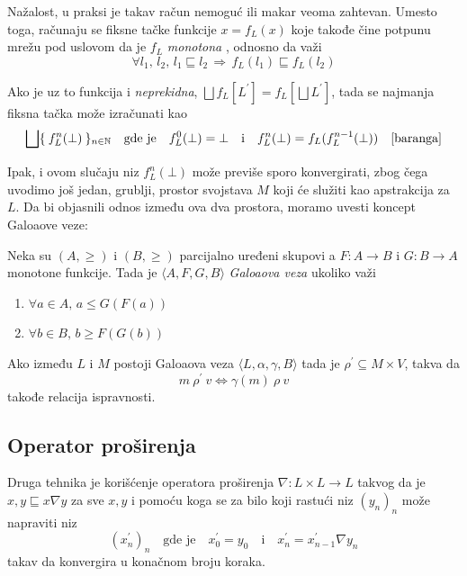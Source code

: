 Nažalost, u praksi je takav račun nemoguć ili makar veoma zahtevan. Umesto toga, računaju se fiksne tačke funkcije $x = f_{L}(x)$ koje takođe čine potpunu mrežu pod uslovom da je $f_{L}$ \emph{monotona} \cite{tarski}, odnosno da važi $$\forall l_{1},\, l_{2},\, l_{1} \sqsubseteq l_{2} \, \Rightarrow \, f_{L}(l_1) \sqsubseteq f_{L}(l_2)$$ 

 Ako je uz to funkcija i \emph{neprekidna}, $\bigsqcup f_{L}[L^{\prime}] = f_{L}[\bigsqcup L^{\prime}]$, tada se najmanja fiksna tačka može izračunati kao $$\bigsqcup \{ \: f^{n}_{L}(\bot)\: \}_{n \in \mathbb{N}} \quad \text{gde je} \quad f^{0}_{L}(\bot) = \bot \quad \text{i} \quad f^{n}_{L}(\bot) = f_{L}(f^{n-1}_{L}(\bot)) \quad \cite{baranga}$$

Ipak, i ovom slučaju niz $f^{n}_{L} ( \bot )$ može previše sporo konvergirati, zbog čega uvodimo još jedan, grublji, prostor svojstava $M$ koji će služiti kao apstrakcija za $L$. Da bi objasnili odnos između ova dva prostora, moramo uvesti koncept Galoaove veze:
\begin{definicija}
Neka su $(A, \geqslant)$ i $(B, \geqslant)$ parcijalno uređeni skupovi a $F : A \rightarrow B$ i $G : B \rightarrow A$ monotone funkcije. Tada je $\langle A, 	F, G, B \rangle$ \emph{Galoaova veza} ukoliko važi 
\begin{enumerate}
\item $\forall a \in A, \, a \leqslant G (F (a))$ 
\item $\forall b \in B, \, b \geqslant F (G (b))$
\end{enumerate}
\end{definicija} 

\begin{teorema}
Ako između $L$ i $M$ postoji Galoaova veza $\langle L, \alpha, \gamma, B \rangle$ tada je $\rho^{\prime} \subseteq M \times V$, takva da $$m\: \rho^{\prime}\: v \iff \gamma (m)\: \rho \: v$$ takođe relacija ispravnosti.
\end{teorema}

\subsection{Operator proširenja}
\label{subsec:widop}

Druga tehnika je korišćenje operatora proširenja $\nabla : L \times L \rightarrow L$ takvog da je $x, y \sqsubseteq x \nabla y$ za sve $x, y$ i pomoću koga se za bilo koji rastući niz $(y_{n})_{n}$ može napraviti niz $$(x^{\prime}_{n})_{n} \quad \text{gde je} \quad x^{\prime}_{0} = y_{0} \quad \text{i} \quad x^{\prime}_{n} = x^{\prime}_{n-1} \nabla y_{n} $$ takav da konvergira u konačnom broju koraka.


